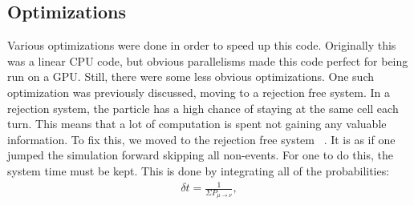 \subsection{Optimizations}
Various optimizations were done in order to speed up this code. Originally this was a linear CPU code, but obvious parallelisms made this code perfect for being run on a GPU. Still, there were some less obvious optimizations. One such optimization was previously discussed, moving to a rejection free system. In a rejection system, the particle has a high chance of staying at the same cell each turn. This means that a lot of computation is spent not gaining any valuable information. To fix this, we moved to the rejection free system ~\cite{Newman99}. It is as if one jumped the simulation forward skipping all non-events. For one to do this, the system time must be kept. This is done by integrating all of the probabilities:
\begin{eqnarray}
\delta t = \frac {1} {\Sigma P_{\mu \rightarrow \nu}},
\label{systemTime}
\end{eqnarray}
